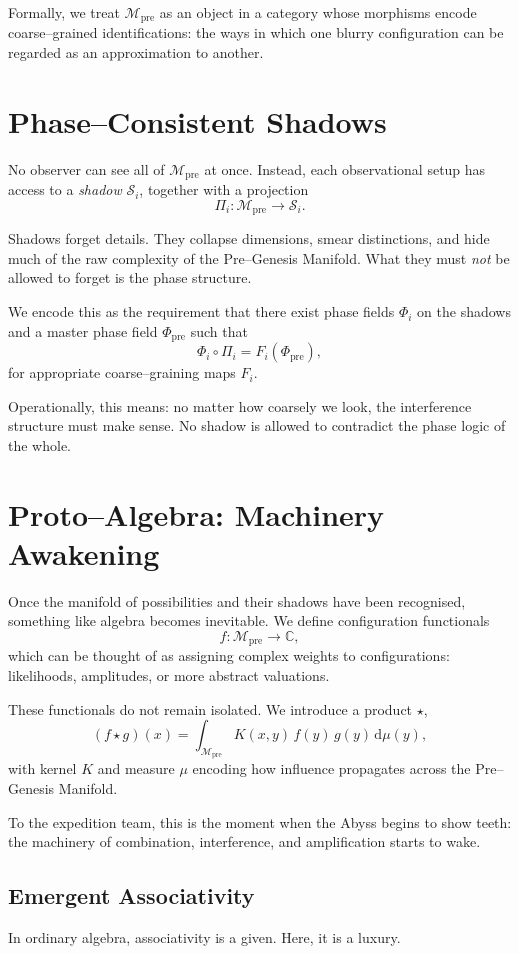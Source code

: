Formally, we treat $\mathcal{M}_\mathrm{pre}$ as an object in a category whose morphisms encode
coarse–grained identifications: the ways in which one blurry configuration can be regarded as an
approximation to another.

\section{Phase–Consistent Shadows}
No observer can see all of $\mathcal{M}_\mathrm{pre}$ at once. Instead, each observational setup
has access to a \emph{shadow} $\mathcal{S}_i$, together with a projection
\[
\Pi_i : \mathcal{M}_\mathrm{pre} \to \mathcal{S}_i.
\]

Shadows forget details. They collapse dimensions, smear distinctions, and hide much of the raw
complexity of the Pre–Genesis Manifold. What they must \emph{not} be allowed to forget is the
phase structure.

We encode this as the requirement that there exist phase fields $\Phi_i$ on the shadows and
a master phase field $\Phi_\mathrm{pre}$ such that
\[
\Phi_i \circ \Pi_i = F_i(\Phi_\mathrm{pre}),
\]
for appropriate coarse–graining maps $F_i$.

Operationally, this means: no matter how coarsely we look, the interference structure must make
sense. No shadow is allowed to contradict the phase logic of the whole.

\section{Proto–Algebra: Machinery Awakening}
Once the manifold of possibilities and their shadows have been recognised, something like algebra
becomes inevitable. We define configuration functionals
\[
f : \mathcal{M}_\mathrm{pre} \to \mathbb{C},
\]
which can be thought of as assigning complex weights to configurations: likelihoods, amplitudes,
or more abstract valuations.

These functionals do not remain isolated. We introduce a product $\star$,
\[
(f \star g)(x)
= \int_{\mathcal{M}_\mathrm{pre}} K(x,y)\, f(y)\, g(y)\,\mathrm{d}\mu(y),
\]
with kernel $K$ and measure $\mu$ encoding how influence propagates across the Pre–Genesis
Manifold.

To the expedition team, this is the moment when the Abyss begins to show teeth: the machinery of
combination, interference, and amplification starts to wake.

\subsection{Emergent Associativity}
In ordinary algebra, associativity is a given. Here, it is a luxury.

